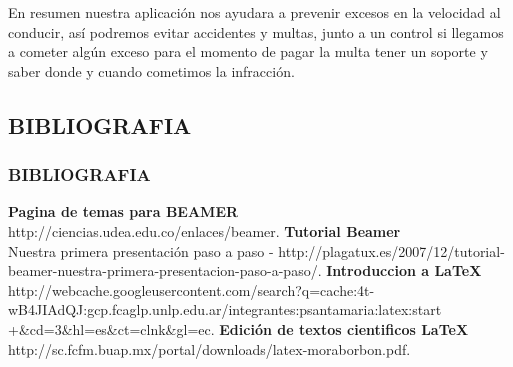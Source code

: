 \documentclass{beamer}						%
\begin{document}
\begin{frame}[allowframebreaks]
{			En resumen nuestra aplicación nos ayudara a prevenir excesos en la velocidad al conducir, así podremos evitar
 			accidentes y multas, junto a un control si llegamos a cometer algún exceso para el momento de pagar la multa tener
 			un soporte y saber donde y cuando cometimos la infracción.}
			
	\end{frame}

	\begin{frame}
		\section{BIBLIOGRAFIA}
		\frametitle{BIBLIOGRAFIA}
		
		\begin{thebibliography}{99}
			\normalsize
			 \textbf{Pagina de temas para BEAMER}\\ http://ciencias.udea.edu.co/enlaces/beamer.
			 \textbf{Tutorial Beamer}\\ Nuestra primera presentación paso a paso - http://plagatux.es/2007/12/tutorial-beamer-nuestra-primera-presentacion-paso-a-paso/.
			 \textbf{Introduccion a \LaTeX}\\ http://webcache.googleusercontent.com/search?q=cache:4t-wB4JIAdQJ:gcp.fcaglp.unlp.edu.ar/integrantes:psantamaria:latex:start\\+\&cd=3\&hl=es\&ct=clnk\&gl=ec.
			 \textbf{Edición de textos cientificos \LaTeX}\\http://sc.fcfm.buap.mx/portal/downloads/latex-moraborbon.pdf.
		\end{thebibliography}
		
	\end{frame}
	
\end{document}
